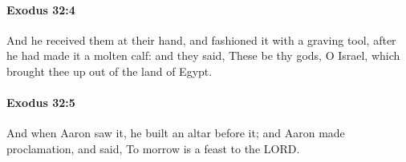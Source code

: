 		\paragraph{Exodus 32:4} %
			\label{EXODUS-32-4}

			And he received them at their hand, and fashioned it with a graving tool, after he had made it a molten calf: and they said, These be thy gods, O Israel, which brought thee up out of the land of Egypt.


		\paragraph{Exodus 32:5} %
			\label{EXODUS-32-5}

			And when Aaron saw it, he built an altar before it; and Aaron made proclamation, and said, To morrow is a feast to the LORD.


